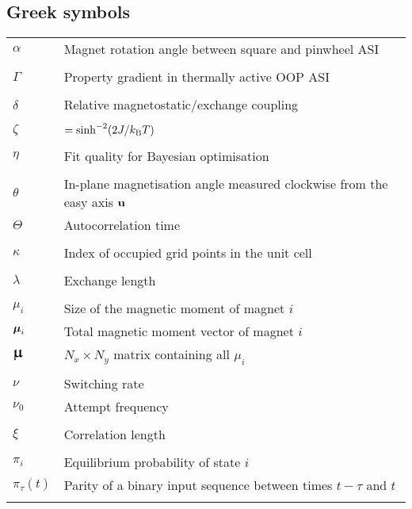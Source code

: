 \subsection*{Greek symbols}
\begin{longtable}[l]{p{60pt} p{350pt}}
	$\alpha$ & Magnet rotation angle between square and pinwheel ASI \\
	&\\
	
	$\Gamma$ & Property gradient in thermally active OOP ASI \\
	&\\

	$\delta$ & Relative magnetostatic/exchange coupling \\
	&\\
	
	$\zeta$ & $=\sinh^{-2}(2J/\kBT)$ \\
	&\\
	
	$\eta$ & Fit quality for Bayesian optimisation \\
	&\\

	$\theta$ & In-plane magnetisation angle measured clockwise from the easy axis $\boldsymbol{\mathbf{u}}$ \\
	$\Theta$ & Autocorrelation time \\
	&\\
	
	$\kappa$ & Index of occupied grid points in the unit cell \\
	&\\
	
	$\lambda$ & Exchange length \\
	&\\

	$\mu_i$ & Size of the magnetic moment of magnet $i$ \\
	$\boldsymbol{\mathbf{\mu}}_i$ & Total magnetic moment vector of magnet $i$ \\
	$\vc{\bigmu}$ & $N_x \times N_y$ matrix containing all $\mu_i$ \\
	&\\
	
	$\nu$ & Switching rate \\
	$\nu_0$ & Attempt frequency \\
	&\\
	
	$\xi$ & Correlation length \\
	&\\

	$\pi_i$ & Equilibrium probability of state $i$ \\
	$\pi_\tau(t)$ & Parity of a binary input sequence between times $t-\tau$ and $t$ \\
	&\\


\end{longtable}
